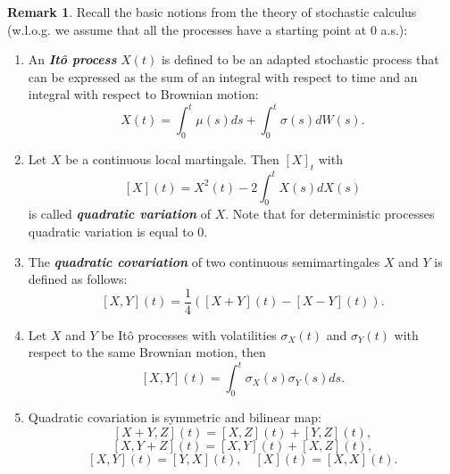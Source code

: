 \documentclass[a4paper,11pt]{article}
\theoremstyle{plain}
\theoremstyle{definition}
\newtheorem{rmrk}[thm]{Remark}
\newcommand{\define}[1]{\textit{\textbf{#1}}}
\begin{document}
	\begin{rmrk} \label{stoch calc notions}
		Recall the basic notions from the theory of stochastic calculus (w.l.o.g. we assume that all the processes have a starting point at $0$ a.s.):
		\begin{enumerate}
			\item An \define{Itô process} $X(t)$ is defined to be an adapted stochastic process that can be expressed as the sum of an integral with respect to time and an integral with respect to Brownian motion:
			\[ X(t) = \int_{0}^{t} \mu(s) ds + \int_{0}^{t} \sigma(s) dW(s). \]
			\item Let $X$ be a continuous local martingale. Then $[X]_t$ with
			\[ [X](t) = X^2(t) - 2 \int_0^t X(s)dX(s) \]
			is called \define{quadratic variation} of $X$. Note that for deterministic processes quadratic variation is equal to $0$.
			\item The \define{quadratic covariation} of two continuous semimartingales $X$ and $Y$ is defined as follows:
			\[ [X, Y](t) = \frac{1}{4}([X + Y](t) - [X-Y](t)). \]
			\item Let $X$ and $Y$ be Itô processes with volatilities ${\sigma_X}(t)$ and ${\sigma_Y}(t)$ with respect to the same Brownian motion, then
			\[ [X, Y](t) = \int_0^t {\sigma_X}(s){\sigma_Y}(s) ds. \]
			\item Quadratic covariation is symmetric and bilinear map:
			\[ [X + Y, Z](t) = [X, Z](t) + [Y, Z](t), \]
			\[ [X, Y + Z](t) = [X, Y](t) + [X, Z](t), \]
			\[ [X, Y](t) = [Y, X](t), \quad [X](t) = [X, X](t). \]
		\end{enumerate}
	\end{rmrk}
	
\end{document}
